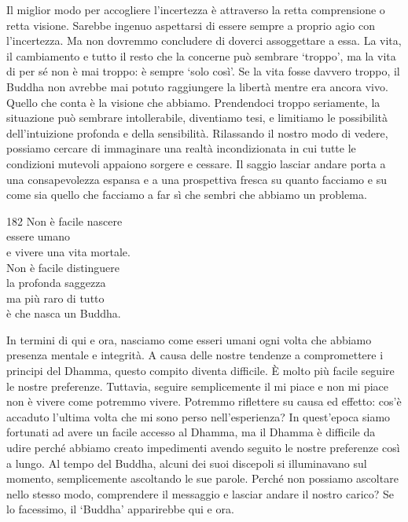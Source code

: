 \begin{dhpRefl}
  Il miglior modo per accogliere l'incertezza è attraverso la retta comprensione
  o retta visione. Sarebbe ingenuo aspettarsi di essere sempre a proprio agio
  con l'incertezza. Ma non dovremmo concludere di doverci assoggettare a essa.
  La vita, il cambiamento e tutto il resto che la concerne può sembrare
  `troppo', ma la vita di per sé non è mai troppo: è sempre `solo così'. Se la
  vita fosse davvero troppo, il Buddha non avrebbe mai potuto raggiungere la
  libertà mentre era ancora vivo. Quello che conta è la visione che abbiamo.
  Prendendoci troppo seriamente, la situazione può sembrare intollerabile,
  diventiamo tesi, e limitiamo le possibilità dell'intuizione profonda e della
  sensibilità. Rilassando il nostro modo di vedere, possiamo cercare di
  immaginare una realtà incondizionata in cui tutte le condizioni mutevoli
  appaiono sorgere e cessare. Il saggio lasciar andare porta a una
  consapevolezza espansa e a una prospettiva fresca su quanto facciamo e su come
  sia quello che facciamo a far sì che sembri che abbiamo un problema.
\end{dhpRefl}


\begin{dhpVerse}{182}
\label{dhp-182}
Non è facile nascere\\
essere umano\\
e vivere una vita mortale.\\
Non è facile distinguere\\
la profonda saggezza\\
ma più raro di tutto\\
è che nasca un Buddha.
\end{dhpVerse}

\begin{dhpRefl}
  In termini di qui e ora, nasciamo come esseri umani ogni volta che abbiamo
  presenza mentale e integrità. A causa delle nostre tendenze a compromettere i
  principi del Dhamma, questo compito diventa difficile. È molto più facile
  seguire le nostre preferenze. Tuttavia, seguire semplicemente il mi piace e
  non mi piace non è vivere come potremmo vivere. Potremmo riflettere su causa
  ed effetto: cos'è accaduto l'ultima volta che mi sono perso nell'esperienza?
  In quest'epoca siamo fortunati ad avere un facile accesso al Dhamma, ma il
  Dhamma è difficile da udire perché abbiamo creato impedimenti avendo seguito
  le nostre preferenze così a lungo. Al tempo del Buddha, alcuni dei suoi
  discepoli si illuminavano sul momento, semplicemente ascoltando le sue parole.
  Perché non possiamo ascoltare nello stesso modo, comprendere il messaggio e
  lasciar andare il nostro carico? Se lo facessimo, il `Buddha' apparirebbe qui
  e ora.
\end{dhpRefl}

